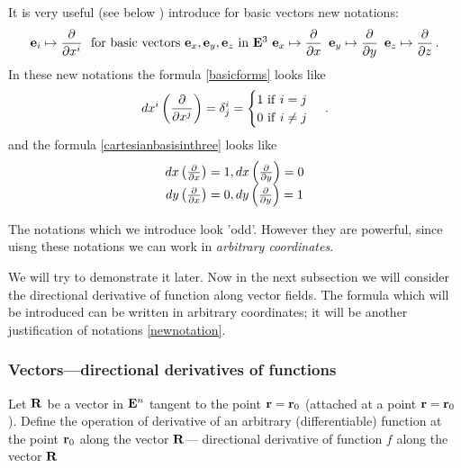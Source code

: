 \documentclass[12pt]{article}
\numberwithin{equation}{section}
\begin{document}
\bigskip

   It is very useful (see below ) introduce for basic 
vectors new notations:
                \begin{equation}\label{newnotation}
                {\bf e}_i\mapsto {\partial\over \partial x^i}\,
                \hbox {\,\,\,for basic vectors 
${\bf e}_x,{\bf e}_y,{\bf e}_z$ in ${\bf E}^3$}\,\,
                {\bf e}_x\mapsto {\partial\over\partial x}\,\,\,{\bf e}_y\mapsto {\partial\over\partial y}\,\,\,
                {\bf e}_z\mapsto {\partial\over\partial z}\,.
                 \end{equation}
In these new notations the formula \eqref{basicforms} looks like
          \begin{equation*}\label{basicforms}
    dx^i\left({\partial\over \partial x^j}\right)=\delta^i_j=\begin{cases}
     1\,\,{\rm if}\,\, i=j\cr 0\,\,{\rm if}\,\, i\not =j\cr
      \end{cases}\,.
\end{equation*}
and the formula \eqref{cartesianbasisinthree} looks like
      \begin{equation*}\label{cartesianbasisinthreenewnotations}
      \begin{matrix}
    dx\left({\partial\over \partial x}\right)=1, dx\left({\partial\over \partial y}\right)=0\cr
    dy\left({\partial\over \partial x}\right)=0, dy\left({\partial\over \partial y}\right)=1\cr
    \end{matrix}
\end{equation*}

The notations which we introduce look 'odd'. However they are powerful, 
since uisng these notations we can work in {\it arbitrary coordinates}.
  
We will try to demonstrate it later. Now 
 in the next subsection we will consider the directional derivative of function along vector fields.   The formula which will be introduced can be written
in arbitrary coordinates; it will be another justification of notations 
\eqref{newnotation}.





 \subsubsection {Vectors---directional derivatives of functions}




Let ${\bf R}$ be a vector in ${\bf E}^n$ tangent to the point ${\bf r}={\bf r}_0$ (attached at a point ${\bf r}={\bf r}_0$).
Define the operation of derivative of an arbitrary
(differentiable) function at the point ${\bf r}_0$ along the vector ${\bf R}$---
directional derivative of function $f$ along the vector ${\bf R}$
\end{document}
